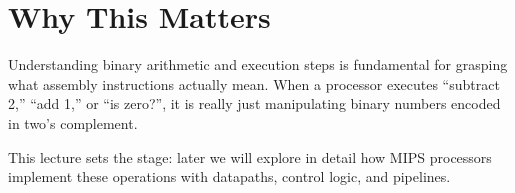 \documentclass[11pt]{article}
\begin{document}
\section*{Why This Matters}
Understanding binary arithmetic and execution steps is fundamental for grasping what assembly instructions actually mean. When a processor executes “subtract 2,” “add 1,” or “is zero?”, it is really just manipulating binary numbers encoded in two’s complement.

This lecture sets the stage: later we will explore in detail how MIPS processors implement these operations with datapaths, control logic, and pipelines.
\end{document}
